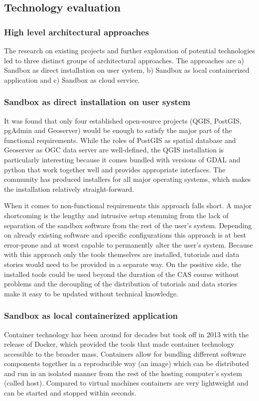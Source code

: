 \documentclass[11pt, a4paper, oneside, parskip=full-]{scrartcl}
\begin{document}
\subsection{Technology evaluation}

\subsubsection{High level architectural approaches}
The research on existing projects and further exploration of potential
technologies led to three distinct groups of architectural approaches. The
approaches are a) Sandbox as direct installation on user system, b) Sandbox as
local containerized application and c) Sandbox as cloud service.

\subsubsection*{Sandbox as direct installation on user system}
It was found that only four established open-source projects (QGIS, PostGIS,
pgAdmin and Geoserver) would be enough to satisfy the major part of the
functional requirements. While the roles of PostGIS as spatial database and
Geoserver as OGC data server are well-defined, the QGIS installation is
particularly interesting because it comes bundled with versions of GDAL and
python that work together well and provides appropriate interfaces. The
community has produced installers for all major operating systems, which makes
the installation relatively straight-forward.

When it comes to non-functional requirements this approach falls short. A major
shortcoming is the lengthy and intrusive setup stemming from the lack of
separation of the sandbox software from the rest of the user's system. Depending
on already existing software and specific configurations this approach is at
best error-prone and at worst capable to permanently alter the user's system.
Because with this approach only the tools themselves are installed, tutorials
and data stories would need to be provided in a separate way. On the positive
side, the installed tools could be used beyond the duration of the CAS course
without problems and the decoupling of the distribution of tutorials and data
stories make it easy to be updated without technical knowledge.

\subsubsection*{Sandbox as local containerized application}
Container technology has been around for decades but took off in 2013 with the
release of Docker, which provided the tools that made container technology
accessible to the broader mass. Containers allow for bundling different software
components together in a reproducible way (an image) which can be distributed
and run in an isolated manner from the rest of the hosting computer's system
(called host). Compared to virtual machines containers are very lightweight and
can be started and stopped within seconds.
\end{document}
